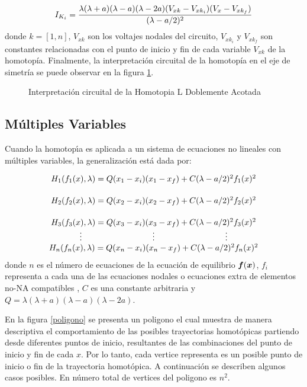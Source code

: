 \documentclass[conference,letterpaper,onecolumn]{IEEEtran}
\newcommand{\pig}[1]{\mbox{\boldmath ${#1}$}	}
\begin{document}
{\begin{equation}
I_{K_i}={\lambda(\lambda+a)(\lambda-a)(\lambda-2a)(V_{xk}-V_{{xk}_i})(V_x-V_{xk_f}) \over (\lambda-a/2)^2}
\label{Ikn}
\end{equation}
donde $k=[1,n]$,  $V_{xk}$ son los voltajes nodales del circuito, $V_{{xk}_i}$ y $V_{{xk}_f}$ son constantes relacionadas con el punto de inicio y fin de cada variable $V_{xk}$ de la homotop{\'i}a.
Finalmente, la
interpretaci\'on circuital de la homotop{\'i}a en el eje de simetr{\'i}a se puede observar en la
figura \ref{circ1}.


\begin{figure}[tbp]
\centerline{
\epsfxsize=140mm
}
\caption{Interpretaci\'on circuital de la Homotopia L Doblemente Acotada}
\label{circ1}
\end{figure}


\subsection{M\'ultiples Variables}


Cuando la homotop\'{\i}a es aplicada a un sistema de ecuaciones no lineales con m\'ultiples variables, la generalizaci\'on est\'a dada por:

\begin{displaymath}
\begin{array}{c}
H_1(f_1(x),\lambda)=Q(x_1-x_i)(x_1-x_f)+C(\lambda-a/2)^2f_1(x)^2 \vspace{5mm} \\
H_2(f_2(x),\lambda)=Q(x_2-x_i)(x_2-x_f)+C(\lambda-a/2)^2f_2(x)^2 \vspace{5mm} \\
H_3(f_3(x),\lambda)=Q(x_3-x_i)(x_3-x_f)+C(\lambda-a/2)^2f_3(x)^2 \\
\vdots  \hspace{30mm} \vdots  \hspace{30mm} \vdots \\
H_n(f_n(x),\lambda)=Q(x_n-x_i)(x_n-x_f)+C(\lambda-a/2)^2f_n(x)^2 \\
\end{array}
\end{displaymath}
donde $n$ es el n\'umero de ecuaciones de la ecuaci\'on de equilibrio $\pig{f}(\pig{x})$, $f_i$ representa a cada una de las ecuaciones nodales o ecuaciones extra de elementos
no-NA compatibles \cite{mnaxx}, $C$ es una constante arbitraria y $Q=\lambda(\lambda+a)(\lambda-a)(\lambda-2a)$.


En la figura \ref{poligono} se presenta un poligono el cual muestra de manera descriptiva el comportamiento de las posibles trayectorias homot\'opicas partiendo desde diferentes
puntos de inicio, resultantes de las combinaciones del punto de inicio y fin de cada $x$. Por lo tanto, cada vertice representa es un posible punto de inicio o fin de la trayectoria homot\'opica.
A continuaci\'on
se describen algunos casos posibles. En n\'umero total de vertices del poligono es $n^2$.



}
\end{document}

